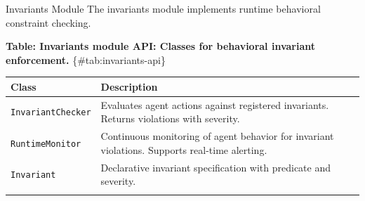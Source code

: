 \documentclass[
  ignorenonframetext,
]{beamer}
\newcounter{none} %
\begin{document}
\begin{frame}{Invariants Module}
\protect{}\label{sec:invariants-api}
The invariants module implements runtime behavioral constraint checking.

\textbf{Table: Invariants module API: Classes for behavioral invariant
enforcement.} \{\#tab:invariants-api\}

{\def\LTcaptype{none} %
\begin{longtable}[]{@{}
  >{\raggedright\arraybackslash}p{}
  >{\raggedright\arraybackslash}p{}@{}}
\toprule\noalign{}
\begin{minipage}[b]{\linewidth}\raggedright
Class
\end{minipage} & \begin{minipage}[b]{\linewidth}\raggedright
Description
\end{minipage} \\
\midrule\noalign{}
\endhead
\texttt{InvariantChecker} & Evaluates agent actions against registered
invariants. Returns violations with severity. \\
\texttt{RuntimeMonitor} & Continuous monitoring of agent behavior for
invariant violations. Supports real-time alerting. \\
\texttt{Invariant} & Declarative invariant specification with predicate
and severity. \\
\bottomrule\noalign{}
\end{longtable}
}
\end{frame}
\end{document}
